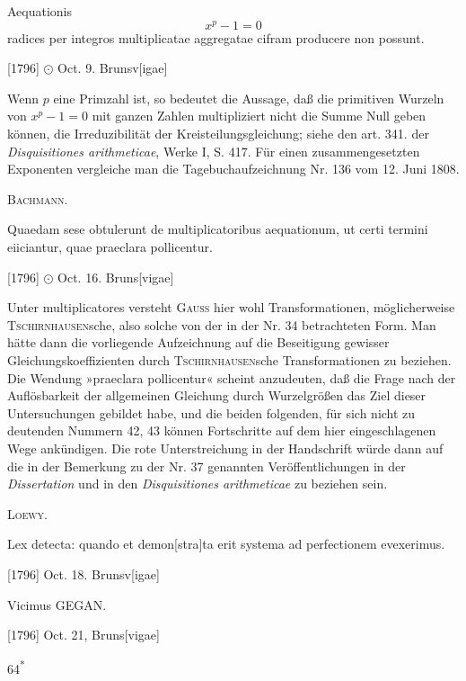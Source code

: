 \clearpage{}
\indent Aequationis
\[
x^p-1=0
\]
\noindent radices per integros multiplicatae aggregatae cifram producere non possunt.
\par\noindent\hfill[1796] \(\odot\) Oct. 9. Brunsv[igae]

\medskip\begingroup\small
\indent Wenn \(p\) eine Primzahl ist, so bedeutet die Aussage, daß die primitiven Wurzeln von \(x^p-1=0\) mit ganzen Zahlen multipliziert nicht die Summe Null geben können, die Irreduzibilität der Kreisteilungsgleichung; siehe den art. 341. der \textit{Disquisitiones arithmeticae}, Werke I, S. 417. Für einen zusammengesetzten Exponenten vergleiche man die Tagebuchaufzeichnung Nr. 136 vom 12. Juni 1808.
\par\noindent\hfill\textsc{Bachmann.}
\par\endgroup

\indent Quaedam sese obtulerunt de multiplicatoribus aequationum, ut certi termini eiiciantur, quae praeclara pollicentur.
\par\noindent\hfill[1796] \(\odot\) Oct. 16. Bruns[vigae]

\medskip\begingroup\small
\indent Unter multiplicatores versteht \textsc{Gauss} hier wohl Transformationen, möglicherweise \textsc{Tschirnhausen}sche, also solche von der in der Nr. 34 betrachteten Form. Man hätte dann die vorliegende Aufzeichnung auf die Beseitigung gewisser Gleichungskoeffizienten durch \textsc{Tschirnhausen}sche Transformationen zu beziehen. Die Wendung »praeclara pollicentur« scheint anzudeuten, daß die Frage nach der Auflösbarkeit der allgemeinen Gleichung durch Wurzelgrößen das Ziel dieser Untersuchungen gebildet habe, und die beiden folgenden, für sich nicht zu deutenden Nummern 42, 43 können Fortschritte auf dem hier eingeschlagenen Wege ankündigen. Die rote Unterstreichung in der Handschrift würde dann auf die in der Bemerkung zu der Nr. 37 genannten Veröffentlichungen in der \textit{Dissertation} und in den \textit{Disquisitiones arithmeticae} zu beziehen sein.
\par\noindent\hfill\textsc{Loewy.}
\par\endgroup

\indent Lex detecta: quando et demon[stra]ta erit systema ad perfectionem evexerimus.
\par\noindent\hfill[1796] Oct. 18. Brunsv[igae]

\indent Vicimus GEGAN.
\par\noindent\hfill[1796] Oct. 21, Bruns[vigae]
\par\vfill\noindent\hfill64\textsuperscript{*}
